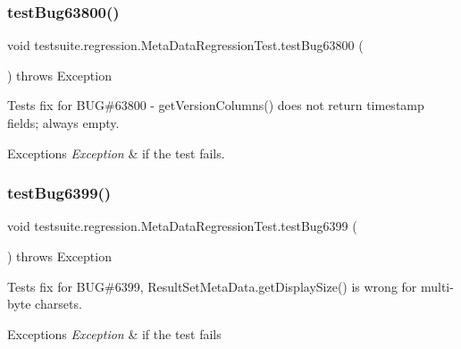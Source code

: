 \subsubsection{\texorpdfstring{test\+Bug63800()}{testBug63800()}}
{\footnotesize\ttfamily void testsuite.\+regression.\+Meta\+Data\+Regression\+Test.\+test\+Bug63800 (\begin{DoxyParamCaption}{ }\end{DoxyParamCaption}) throws Exception}

Tests fix for B\+UG\#63800 -\/ get\+Version\+Columns() does not return timestamp fields; always empty.


\begin{DoxyExceptions}{Exceptions}
{\em Exception} & if the test fails. \\
\hline
\end{DoxyExceptions}
\mbox{\label{classtestsuite_1_1regression_1_1_meta_data_regression_test_ad90f2153ff1faa28e41a28116ad400ca}} 
\subsubsection{\texorpdfstring{test\+Bug6399()}{testBug6399()}}
{\footnotesize\ttfamily void testsuite.\+regression.\+Meta\+Data\+Regression\+Test.\+test\+Bug6399 (\begin{DoxyParamCaption}{ }\end{DoxyParamCaption}) throws Exception}

Tests fix for B\+UG\#6399, Result\+Set\+Meta\+Data.\+get\+Display\+Size() is wrong for multi-\/byte charsets.


\begin{DoxyExceptions}{Exceptions}
{\em Exception} & if the test fails \\
\hline
\end{DoxyExceptions}
\mbox{\label{classtestsuite_1_1regression_1_1_meta_data_regression_test_a8cde8eefe9689a7113484b6de4827afd}} 
